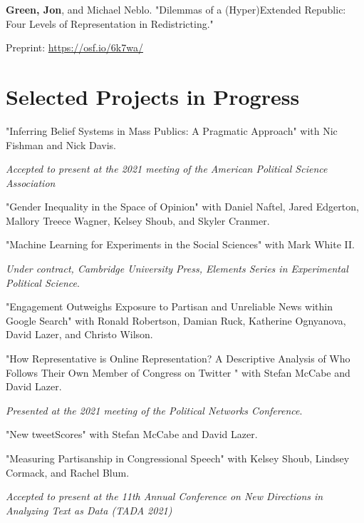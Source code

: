 \documentclass[letterpaper]{article}
\renewenvironment{itemize}{
  \begin{list}{}{
    \setlength{\leftmargin}{1.5em}
  }
}{
  \end{list}
}
\begin{document}
\begin{itemize}
\item \textbf{Green, Jon}, and Michael Neblo. "Dilemmas of a (Hyper)Extended Republic: Four Levels of Representation in Redistricting." 
\begin{itemize}
\item Preprint: \url{https://osf.io/6k7wa/}
\end{itemize}

\end{itemize}

\section*{Selected Projects in Progress}

\begin{itemize}

\item "Inferring Belief Systems in Mass Publics: A Pragmatic Approach" with Nic Fishman and Nick Davis.
\begin{itemize}
\item \textit{Accepted to present at the 2021 meeting of the American Political Science Association}
\end{itemize} 

\item "Gender Inequality in the Space of Opinion" with Daniel Naftel, Jared Edgerton, Mallory Treece Wagner, Kelsey Shoub, and Skyler Cranmer.

\item "Machine Learning for Experiments in the Social Sciences" with Mark White II.
\begin{itemize}
\item  \textit{Under contract, Cambridge University Press, Elements Series in Experimental Political Science}.
\end{itemize}

\item "Engagement Outweighs Exposure to Partisan and Unreliable News within Google Search" with Ronald Robertson, Damian Ruck, Katherine Ognyanova, David Lazer, and Christo Wilson.

\item "How Representative is Online Representation? A Descriptive Analysis of Who Follows Their Own Member of Congress on Twitter " with Stefan McCabe and David Lazer.
\begin{itemize}
\item \textit{Presented at the 2021 meeting of the Political Networks Conference}.
\end{itemize} 

\item "New tweetScores" with Stefan McCabe and David Lazer.

\item "Measuring Partisanship in Congressional Speech" with Kelsey Shoub, Lindsey Cormack, and Rachel Blum.
\begin{itemize}
\item \textit{Accepted to present at the 11th Annual Conference on New Directions in Analyzing Text as Data (TADA 2021)}
\end{itemize}

\end{itemize}
\end{document}
